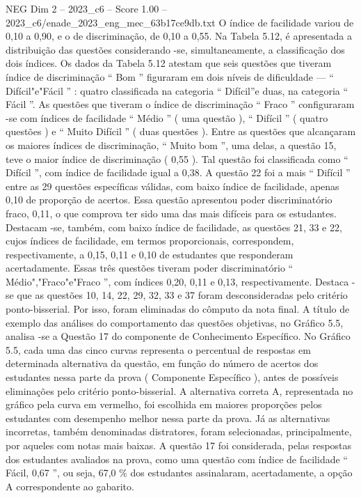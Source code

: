 \begin{textsample}{NEG Dim 2 – 2023\_c6 – Score 1.00 – 2023\_c6/enade\_2023\_eng\_mec\_63b17ce9db.txt}
O índice de facilidade variou de 0,10 a 0,90, e o de discriminação, de 0,10 a 0,55.
Na Tabela 5.12, é apresentada a distribuição das questões considerando -se, simultaneamente, a classificação dos dois índices.
Os dados da Tabela 5.12 atestam que seis questões que tiveram índice de discriminação “ Bom ” figuraram em dois níveis de dificuldade — “ Difícil"e"Fácil ” : quatro classificada na categoria “ Difícil”e duas, na categoria “ Fácil ”.
As questões que tiveram o índice de discriminação “ Fraco ” configuraram -se com índices de facilidade “ Médio ” ( uma questão ), “ Difícil ” ( quatro questões ) e “ Muito Difícil ” ( duas questões ).
Entre as questões que alcançaram os maiores índices de discriminação, “ Muito bom ”, uma delas, a questão 15, teve o maior índice de discriminação ( 0,55 ).
Tal questão foi classificada como “ Difícil ”, com índice de facilidade igual a 0,38.
A questão 22 foi a mais “ Difícil ” entre as 29 questões específicas válidas, com baixo índice de facilidade, apenas 0,10 de proporção de acertos.
Essa questão apresentou poder discriminatório fraco, 0,11, o que comprova ter sido uma das mais difíceis para os estudantes.
Destacam -se, também, com baixo índice de facilidade, as questões 21, 33 e 22, cujos índices de facilidade, em termos proporcionais, correspondem, respectivamente, a 0,15, 0,11 e 0,10 de estudantes que responderam acertadamente.
Essas três questões tiveram poder discriminatório “ Médio","Fraco"e"Fraco ”, com índices 0,20, 0,11 e 0,13, respectivamente.
Destaca -se que as questões 10, 14, 22, 29, 32, 33 e 37 foram desconsideradas pelo critério ponto-bisserial.
Por isso, foram eliminadas do cômputo da nota final.
A título de exemplo das análises do comportamento das questões objetivas, no Gráfico 5.5, analisa -se a Questão 17 do componente de Conhecimento Específico.
No Gráfico 5.5, cada uma das cinco curvas representa o percentual de respostas em determinada alternativa da questão, em função do número de acertos dos estudantes nessa parte da prova ( Componente Específico ), antes de possíveis eliminações pelo critério ponto-bisserial.
A alternativa correta A, representada no gráfico pela curva em vermelho, foi escolhida em maiores proporções pelos estudantes com desempenho melhor nessa parte da prova.
Já as alternativas incorretas, também denominadas distratores, foram selecionadas, principalmente, por aqueles com notas mais baixas.
A questão 17 foi considerada, pelas respostas dos estudantes avaliados na prova, como uma questão com índice de facilidade “ Fácil, 0,67 ”, ou seja, 67,0 \% dos estudantes assinalaram, acertadamente, a opção A correspondente ao gabarito.

\end{textsample}
